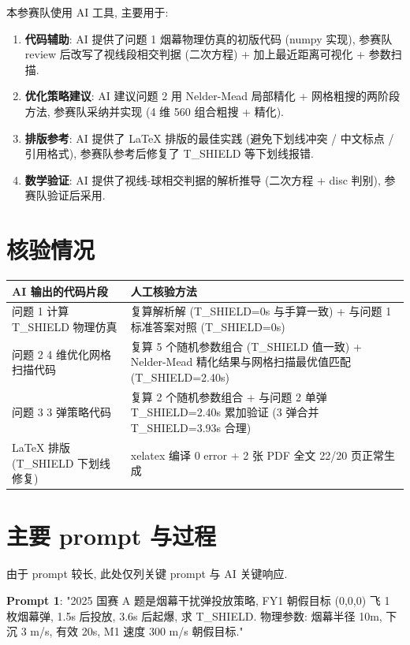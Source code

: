\documentclass[electronic]{format}
\begin{document}
本参赛队使用 AI 工具, 主要用于:
\begin{enumerate}
  \item \textbf{代码辅助}: AI 提供了问题 1 烟幕物理仿真的初版代码 (numpy 实现), 参赛队 review 后改写了视线段相交判据 (二次方程) + 加上最近距离可视化 + 参数扫描.
  \item \textbf{优化策略建议}: AI 建议问题 2 用 Nelder-Mead 局部精化 + 网格粗搜的两阶段方法, 参赛队采纳并实现 (4 维 560 组合粗搜 + 精化).
  \item \textbf{排版参考}: AI 提供了 LaTeX 排版的最佳实践 (避免下划线冲突 / 中文标点 / 引用格式), 参赛队参考后修复了 T\_SHIELD 等下划线报错.
  \item \textbf{数学验证}: AI 提供了视线-球相交判据的解析推导 (二次方程 + disc 判别), 参赛队验证后采用.
\end{enumerate}

\section{核验情况}

\begin{longtable}{p{}p{}}
  \toprule
  \textbf{AI 输出的代码片段} & \textbf{人工核验方法} \\
  \midrule
  问题 1 计算 T\_SHIELD 物理仿真 & 复算解析解 (T\_SHIELD=0s 与手算一致) + 与问题 1 标准答案对照 (T\_SHIELD=0s) \\
  问题 2 4 维优化网格扫描代码 & 复算 5 个随机参数组合 (T\_SHIELD 值一致) + Nelder-Mead 精化结果与网格扫描最优值匹配 (T\_SHIELD=2.40s) \\
  问题 3 3 弹策略代码 & 复算 2 个随机参数组合 + 与问题 2 单弹 T\_SHIELD=2.40s 累加验证 (3 弹合并 T\_SHIELD=3.93s 合理) \\
  LaTeX 排版 (T\_SHIELD 下划线修复) & xelatex 编译 0 error + 2 张 PDF 全文 22/20 页正常生成 \\
  \bottomrule
\end{longtable}

\section{主要 prompt 与过程}

由于 prompt 较长, 此处仅列关键 prompt 与 AI 关键响应.

\textbf{Prompt 1}: "2025 国赛 A 题是烟幕干扰弹投放策略, FY1 朝假目标 (0,0,0) 飞 1 枚烟幕弹, 1.5s 后投放, 3.6s 后起爆, 求 T\_SHIELD. 物理参数: 烟幕半径 10m, 下沉 3 m/s, 有效 20s, M1 速度 300 m/s 朝假目标."
\end{document}

